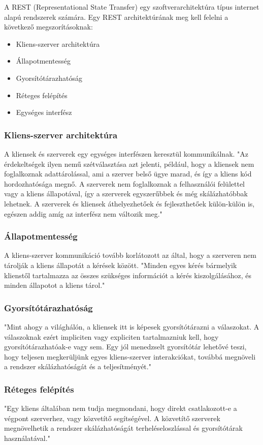 A REST (Representational State Transfer) \cite{Wikipedia-REST} egy szoftverarchitektúra típus internet alapú rendszerek számára.
Egy REST architektúrának meg kell felelni a következő megszorításoknak:
\begin{itemize}
    \item Kliens-szerver architektúra
    \item Állapotmentesség
    \item Gyorsítótárazhatóság
    \item Réteges felépítés
    \item Egységes interfész
\end{itemize}

\subsubsection{Kliens-szerver architektúra}
A kliensek és szerverek egy egységes interfészen keresztül kommunikálnak.
"Az érdekeltségek ilyen nemű szétválasztása azt jelenti, például, hogy a kliensek nem foglalkoznak adattárolással, ami a szerver belső ügye marad, és így a kliens kód hordozhatósága megnő.
A szerverek nem foglalkoznak a felhasználói felülettel vagy a kliens állapotával, így a szerverek egyszerűbbek és még skálázhatóbbak lehetnek.
A szerverek és kliensek áthelyezhetőek és fejleszthetőek külön-külön is, egészen addig amíg az interfész nem változik meg."
\subsubsection{Állapotmentesség}
A kliens-szerver kommunikáció tovább korlátozott az által, hogy a szerveren nem tárolják a kliens állapotát a kérések között.
"Minden egyes kérés bármelyik klienstől tartalmazza az összes szükséges információt a kérés kiszolgálásához, és minden állapotot a kliens tárol."
\subsubsection{Gyorsítótárazhatóság}
"Mint ahogy a világhálón, a kliensek itt is képesek gyorsítótárazni a válaszokat.
A válaszoknak ezért impliciten vagy expliciten tartalmazniuk kell, hogy gyorsítótárazhatóak-e vagy sem.
Egy jól menedzselt gyorsítótár lehetővé teszi, hogy teljesen megkerüljünk egyes kliens-szerver interakciókat, továbbá megnöveli a rendszer skálázhatóságát és a teljesítményét."
\subsubsection{Réteges felépítés}
"Egy kliens általában nem tudja megmondani, hogy direkt csatlakozott-e a végpont szerverhez, vagy közvetítő segítségével.
A közvetítő szerverek megnövelhetik a rendszer skálázhatóságát terheléseloszlással és gyorsítótárak használatával."
